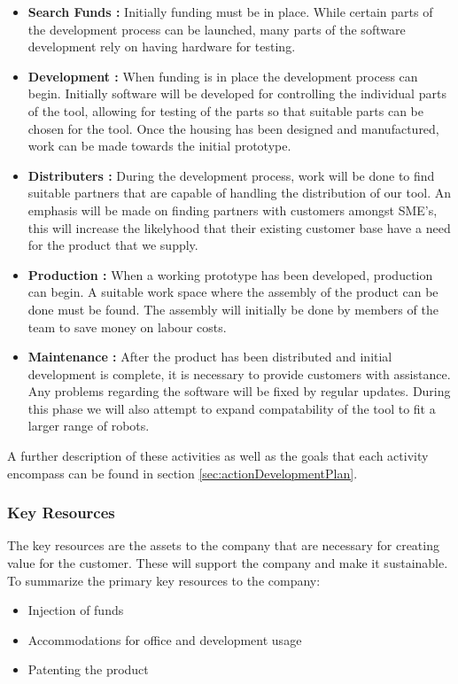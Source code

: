 \begin{itemize}
	\item \textbf{Search Funds	:} Initially funding must be in place. While certain parts of the development process can be launched, many parts of the software development rely on having hardware for testing. 
	\item \textbf{Development	:} When funding is in place the development process can begin. Initially software will be developed for controlling the individual parts of the tool, allowing for testing of the parts so that suitable parts can be chosen for the tool. Once the housing has been designed and manufactured, work can be made towards the initial prototype.
	\item \textbf{Distributers	:} During the development process, work will be done to find suitable partners that are capable of handling the distribution of our tool. An emphasis will be made on finding partners with customers amongst SME's, this will increase the likelyhood that their existing customer base have a need for the product that we supply.
	\item \textbf{Production	:} When a working prototype has been developed, production can begin. A suitable work space where the assembly of the product can be done must be found. The assembly will initially be done by members of the team to save money on labour costs. 
	\item \textbf{Maintenance	:} After the product has been distributed and initial development is complete, it is necessary to provide customers with assistance. Any problems regarding the software will be fixed by regular updates. During this phase we will also attempt to expand compatability of the tool to fit a larger range of robots.
\end{itemize} 

A further description of these activities as well as the goals that each activity encompass can be found in section \ref{sec:actionDevelopmentPlan}.
\subsubsection{Key Resources}
The key resources are the assets to the company that are necessary for creating value for the customer. These will support the company and make it sustainable.
To summarize the primary key resources to the company:
\begin{itemize}
\item Injection of funds
\item Accommodations for office and development usage
\item Patenting the product
\end{itemize}
